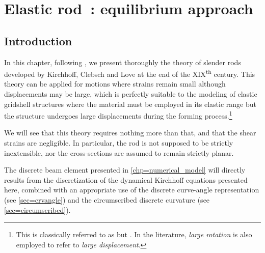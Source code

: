 
\newrefsegment
\chapter{Elastic rod~: equilibrium approach}\label{chp=kirchhoff}

\section{Introduction}

In this chapter, following , we present thoroughly the theory of slender rods developed by Kirchhoff, Clebsch and Love at the end of the XIX\textsuperscript{th} century. This theory can be applied for motions where strains remain small although displacements may be large, which is perfectly suitable to the modeling of elastic gridshell structures where the material must be employed in its elastic range but the structure undergoes large displacements during the forming process.\footnote{This is classically referred to as  but . In the literature, \emph{large rotation} is also employed to refer to \emph{large displacement}.}

We will see that this theory requires nothing more than that, and that the shear strains are negligible. In particular, the rod is not supposed to be strictly inextensible, nor the cross-sections are assumed to remain strictly planar.

The discrete beam element presented in \cref{chp=numerical_model} will directly results from the discretization of the dynamical Kirchhoff equations presented here, combined with an appropriate use of the discrete curve-angle representation (see \cref{sec=crvangle}) and the circumscribed discrete curvature (see \cref{sec=circumscribed}).

